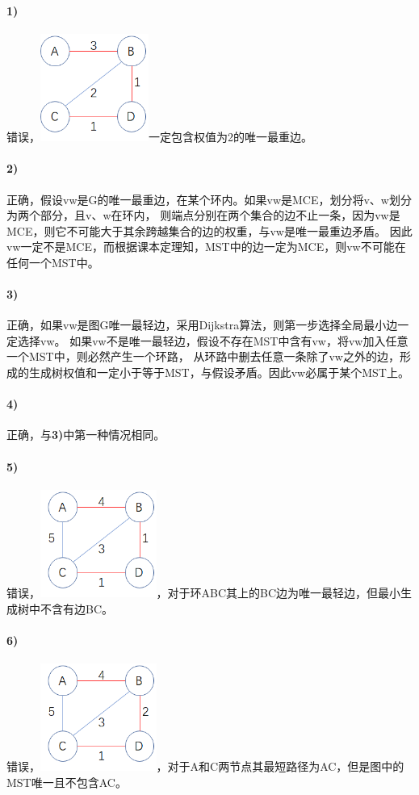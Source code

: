 \documentclass[11pt,a4paper,oneside,oldfontcommands]{ctexart}
\begin{document}
\paragraph*{1)}
错误，\includegraphics[height=100pt]{10-15-1.png}一定包含权值为2的唯一最重边。
\hypertarget{problem101502}{\paragraph*{2)}}
正确，假设vw是G的唯一最重边，在某个环内。如果vw是MCE，划分将v、w划分为两个部分，且v、w在环内，
则端点分别在两个集合的边不止一条，因为vw是MCE，则它不可能大于其余跨越集合的边的权重，与vw是唯一最重边矛盾。
因此vw一定不是MCE，而根据课本定理知，MST中的边一定为MCE，则vw不可能在任何一个MST中。
\paragraph*{3)}
正确，如果vw是图G唯一最轻边，采用Dijkstra算法，则第一步选择全局最小边一定选择vw。
如果vw不是唯一最轻边，假设不存在MST中含有vw，将vw加入任意一个MST中，则必然产生一个环路，
从环路中删去任意一条除了vw之外的边，形成的生成树权值和一定小于等于MST，与假设矛盾。因此vw必属于某个MST上。
\paragraph*{4)}
正确，与\textbf{3)}中第一种情况相同。
\paragraph*{5)}
错误，\includegraphics[height=100pt]{10-15-5.png}，对于环ABC其上的BC边为唯一最轻边，但最小生成树中不含有边BC。
\paragraph*{6)}
错误，\includegraphics[height=100pt]{10-15-6.png}，对于A和C两节点其最短路径为AC，但是图中的MST唯一且不包含AC。
\end{document}
